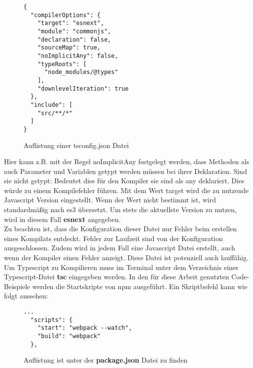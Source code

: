 \begin{figure}[H]
\begin{lstlisting}[basicstyle=\small]
{
  "compilerOptions": {
    "target": "esnext",
    "module": "commonjs",
    "declaration": false,
    "sourceMap": true,
    "noImplicitAny": false,
    "typeRoots": [
      "node_modules/@types"
    ],
    "downlevelIteration": true
  },
  "include": [
    "src/**/*"
  ]
} 
\end{lstlisting}
\caption{Auflistung einer tsconfig.json Datei}
\end{figure}

\noindent
Hier kann z.B. mit der Regel \glqq noImplicitAny\grqq{} festgelegt werden, dass Methoden als auch Parameter und Variablen getypt werden müssen bei ihrer Deklaration. Sind sie nicht getypt: Bedeutet dies für den Kompiler sie sind als any deklariert. Dies würde zu einem Kompilefehler führen\cite{tsconfig}. Mit dem Wert \glqq target\grqq{} wird die zu nutzende Javascript Version eingestellt. Wenn der Wert nicht bestimmt ist, wird standardmäßig nach es3 übersetzt. Um stets die aktuellste Version zu nutzen, wird in diesem Fall \textbf{esnext} angegeben.\\

\noindent
Zu beachten ist, dass die Konfiguration dieser Datei nur Fehler beim erstellen eines Kompilats entdeckt. Fehler zur Laufzeit sind von der Konfiguration ausgeschlossen. Zudem wird in jedem Fall eine Javascript Datei erstellt, auch wenn der Kompiler einen Fehler anzeigt. Diese Datei ist potenziell auch lauffähig. Um Typescript zu Kompilieren muss im Terminal unter dem Verzeichnis einer Typescript-Datei \textbf{tsc} eingegeben werden. In den für diese Arbeit genutzten Code-Beispiele werden die Startskripte von npm ausgeführt. Ein Skriptbefehl kann wie folgt aussehen:

\begin{figure}[H]
\begin{lstlisting}[basicstyle=\small]
  ...
  "scripts": {
    "start": "webpack --watch",
    "build": "webpack"
  }, 
\end{lstlisting}
\caption{Auflistung ist unter der \textbf{package.json} Datei zu finden}
\end{figure}

